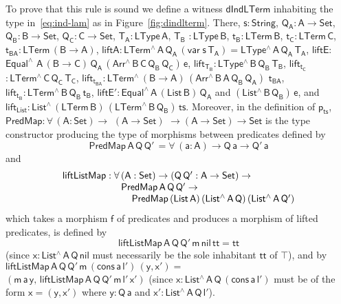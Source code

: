 \documentclass[sigplan,10pt]{acmart}
\begin{document}
To prove that this rule is sound we define a witness
$\mathsf{dIndLTerm}$ inhabiting the type in~\eqref{eq:ind-lam} as in
Figure~\ref{fig:dindlterm}. There, $\mathsf{s : String}$, $\mathsf{Q_A
  : A \to Set}$, $\mathsf{Q_B : B \to Set}$, $\mathsf{Q_C : C \to
  Set}$, $\mathsf{T_A : LType\,A}$, $\mathsf{T_B}$ $\mathsf{:
  LType\,B}$, $\mathsf{t_B : LTerm\,B}$, $\mathsf{t_C : LTerm\,C}$,
$\mathsf{t_{BA} : LTerm\,(B \to A)}$, $\mathsf{liftA :
  LTerm^{\wedge}\, A\, Q_A\, (var\;s\,T_A) =
  LType^{\wedge}\,A\,Q_A\,T_A}$, $\mathsf{liftE :}$
$\mathsf{Equal^{\wedge}}$ $\mathsf{A\, (B \to C)\, Q_A\, (Arr^{\wedge}
  \, B\, C\, Q_B \, Q_C) \, e}$, $\mathsf{lift_{T_B}: LType^{\wedge}
  \, B\, Q_B\, T_B}$, $\mathsf{lift_{t_C}}$ $\mathsf{: LTerm^{\wedge}
  \, C\, Q_C\, T_C}$, $\mathsf{lift_{t_{BA}}: LTerm^{\wedge} \, (B \to
  A)\, (Arr^{\wedge} \, B\, A\, Q_B \, Q_A)}$ $\mathsf{t_{BA}}$,
$\mathsf{lift_{t_B}: LTerm^{\wedge} \, B\, Q_B\, t_B}$,
$\mathsf{liftE' : Equal^{\wedge}\, A\, (List\,B)\, Q_A}$ and
$\mathsf{(List^{\wedge}\, B\, Q_B)\, e}$, and $\mathsf{lift_{List}:
  List^{\wedge} \, (LTerm\, B) \, (LTerm^{\wedge}\, B\, Q_B) \, ts}$.
Moreover, in the definition of $\mathsf{p_{ts}}$, $\mathsf{PredMap :
  \forall\, (A : Set) \to}$ $\mathsf{(A \to Set)}$ $\mathsf{\to (A \to
  Set) \to Set }$ is the type constructor producing the type of
morphisms between predicates defined by
\[\mathsf{PredMap \,A\, Q\,Q'\,
  = \forall\, (a : A) \to Q\,a \to Q'\,a}\] and
\[\begin{array}{l}
\mathsf{liftListMap : \forall\, (A : Set) \to (Q \, Q' : A \to Set)
  \to}\\\
\hspace*{0.8in}\mathsf{PredMap\,A\,Q\,Q' \to}\\
\hspace*{1in}\mathsf{PredMap\,(List\,A)
  \,(List^{\wedge}\, A\, Q)\, (List^{\wedge}\, A\, Q')}
\end{array}\]
which takes a morphism $\mathsf{f}$ of predicates and produces a
morphism of lifted predicates, is defined by
\[\mathsf{liftListMap\, A\, Q\, Q'\, m\, nil\, tt = tt}\]
(since $\mathsf{x : List^{\wedge}\,
  A\, Q\, nil}$ must necessarily be the sole inhabitant $\mathsf{tt}$
of $\mathsf{\top}$), and by $\mathsf{liftListMap\, A\, Q\, Q'\, m\,
  (cons\, a\, l')\, (y, x') =}$\\ $\mathsf{ (m\,a\,y, \,liftListMap\, A\,
  Q\, Q'\, m\, l'\, x')}$ (since $\mathsf{x : List^{\wedge}\, A\,
  Q\, (cons\, a\, l')}$ must be of the form $\mathsf{x = (y, x')}$
where $\mathsf{y : Q\,a}$ and $\mathsf{x' : List^{\wedge}\, A\, Q\,
  l'}$).
\end{document}
